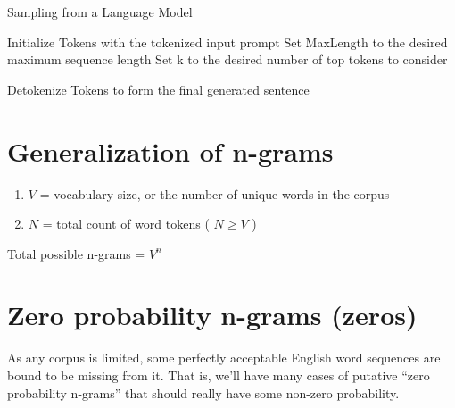 \begin{algorithm}
    \caption{Sampling from a Language Model}
    Initialize Tokens with the tokenized input prompt\;
    Set MaxLength to the desired maximum sequence length\;
    Set k to the desired number of top tokens to consider\;
    
    
    Detokenize Tokens to form the final generated sentence\;
\end{algorithm}


\section{Generalization of n-grams \cite{nlp-1}}
\begin{enumerate}
    \item $V$ = vocabulary size, or the number of unique words in the corpus
    \item $N$ = total count of word tokens ( $N \geq V$ )
\end{enumerate}

Total possible n-grams = $V^n$

\section{Zero probability n-grams (zeros) \cite{nlp-1}}

As any corpus is limited, some perfectly acceptable English word sequences are bound to be missing from it. That is, we’ll have many cases of putative “zero probability n-grams” that should really have some non-zero probability.

